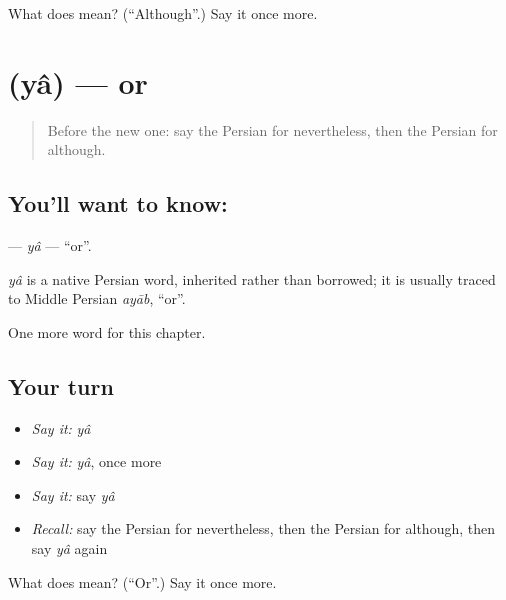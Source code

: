 \begin{tcolorbox}[breakable,colback=teal!4,colframe=teal!35!black,title={Before you move on}]
What does  mean? (\textquotedblleft{}Although\textquotedblright{}.) Say it once more.
\end{tcolorbox}
\section[\texorpdfstring{\fa{یا} (yâ)}{یا (yâ)}]{ (yâ) — or}

\label{lesson:FA-C197-ya}



\begin{quote}
Before the new one: say the Persian for nevertheless, then the Persian for although.
\end{quote}

\subsection*{You'll want to know: }
\textbf{} — \emph{yâ} — \textquotedblleft{}or\textquotedblright{}.

\begin{cousinweb}
\emph{yâ} is a native Persian word, inherited rather than borrowed; it is usually traced to Middle Persian \emph{ayāb}, \textquotedblleft{}or\textquotedblright{}.
\end{cousinweb}

\begin{grammarlens}[title={What you've built}]
One more word for this chapter.
\end{grammarlens}

\subsection*{Your turn}
\begin{itemize}
\raggedright
  \item \emph{Say it:} \emph{yâ}
  \item \emph{Say it:} \emph{yâ}, once more
  \item \emph{Say it:} say \emph{yâ}
  \item \emph{Recall:} say the Persian for nevertheless, then the Persian for although, then say \emph{yâ} again
\end{itemize}

\begin{tcolorbox}[breakable,colback=teal!4,colframe=teal!35!black,title={Before you move on}]
What does  mean? (\textquotedblleft{}Or\textquotedblright{}.) Say it once more.
\end{tcolorbox}

